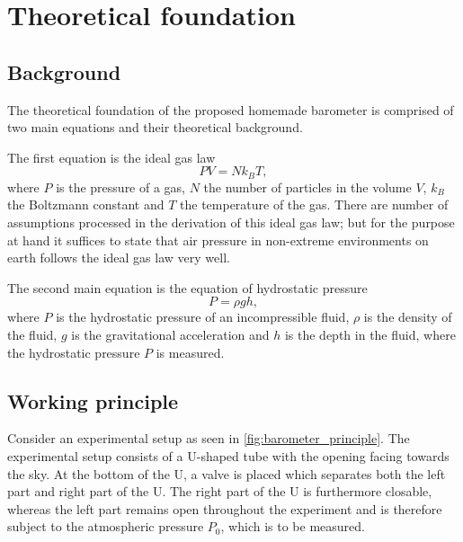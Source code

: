 \documentclass[a4paper,10pt, twocolumn]{article}
\begin{document}
\section{Theoretical foundation}
\subsection{Background}
The theoretical foundation of the proposed homemade barometer is comprised of two main equations and their theoretical background. 

The first equation is the ideal gas law \begin{equation}
	PV = Nk_B T,
\end{equation} where $P$ is the pressure of a gas, $N$ the number of particles in the volume $V$, $k_B$ the Boltzmann constant and $T$ the temperature of the gas. There are number of assumptions processed in the derivation of this ideal gas law; but for the purpose at hand it suffices to state that air pressure in non-extreme environments on earth follows the ideal gas law very well.

The second main equation is the equation of hydrostatic pressure \begin{equation}
	P = \rho g h,
\end{equation} where $P$ is the hydrostatic pressure of an incompressible fluid, $\rho$ is the density of the fluid, $g$ is the gravitational acceleration and $h$ is the depth in the fluid, where the hydrostatic pressure $P$ is measured.

\subsection{Working principle}
Consider an experimental setup as seen in \cref{fig:barometer_principle}. The experimental setup consists of a U-shaped tube with the opening facing towards the sky. At the bottom of the U, a valve is placed which separates both the left part and right part of the U. The right part of the U is furthermore closable, whereas the left part remains open throughout the experiment and is therefore subject to the atmospheric pressure $P_0$, which is to be measured. 
\end{document}
